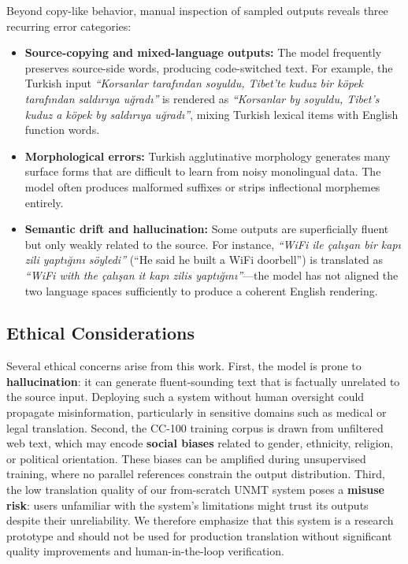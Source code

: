 \documentclass[runningheads]{llncs}
\begin{document}
Beyond copy-like behavior, manual inspection of sampled outputs reveals three recurring error categories:
\begin{itemize}
    \item \textbf{Source-copying and mixed-language outputs:} The model frequently preserves source-side words, producing code-switched text. For example, the Turkish input \textit{``Korsanlar taraf\i{}ndan soyuldu, Tibet'te kuduz bir k\"opek taraf\i{}ndan sald\i{}r\i{}ya u\u{g}rad\i{}''} is rendered as \textit{``Korsanlar by soyuldu, Tibet's kuduz a k\"opek by sald\i{}r\i{}ya u\u{g}rad\i{}''}, mixing Turkish lexical items with English function words.
    \item \textbf{Morphological errors:} Turkish agglutinative morphology generates many surface forms that are difficult to learn from noisy monolingual data. The model often produces malformed suffixes or strips inflectional morphemes entirely.
    \item \textbf{Semantic drift and hallucination:} Some outputs are superficially fluent but only weakly related to the source. For instance, \textit{``WiFi ile \c{c}al\i{}\c{s}an bir kap\i{} zili yapt\i{}\u{g}\i{}n\i{} s\"oyledi''} (``He said he built a WiFi doorbell'') is translated as \textit{``WiFi with the \c{c}al\i{}\c{s}an it kap\i{} zilis yapt\i{}\u{g}\i{}n\i{}''}---the model has not aligned the two language spaces sufficiently to produce a coherent English rendering.
\end{itemize}

\subsection{Ethical Considerations}

Several ethical concerns arise from this work. First, the model is prone to \textbf{hallucination}: it can generate fluent-sounding text that is factually unrelated to the source input. Deploying such a system without human oversight could propagate misinformation, particularly in sensitive domains such as medical or legal translation. Second, the CC-100 training corpus is drawn from unfiltered web text, which may encode \textbf{social biases} related to gender, ethnicity, religion, or political orientation. These biases can be amplified during unsupervised training, where no parallel references constrain the output distribution. Third, the low translation quality of our from-scratch UNMT system poses a \textbf{misuse risk}: users unfamiliar with the system's limitations might trust its outputs despite their unreliability. We therefore emphasize that this system is a research prototype and should not be used for production translation without significant quality improvements and human-in-the-loop verification.
\end{document}
